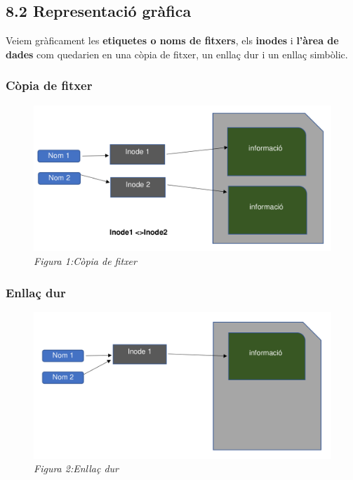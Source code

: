 \documentclass[
  12 pt,
  a4paper,
]{article}
\begin{document}
\subsection{8.2 Representació
gràfica}\label{representaciuxf3-gruxe0fica}

Veiem gràficament les \textbf{etiquetes o noms de fitxers}, els
\textbf{inodes} i \textbf{l'àrea de dades} com quedarien en una còpia de
fitxer, un enllaç dur i un enllaç simbòlic.

\subsubsection{Còpia de fitxer}\label{cuxf2pia-de-fitxer}

\begin{figure}
\centering
\includegraphics{png/copiadeFitxer.png}
\caption{\emph{Figura 1:Còpia de fitxer}}
\end{figure}

\subsubsection{Enllaç dur}\label{enllauxe7-dur}

\begin{figure}
\centering
\includegraphics{png/enllaçDur.png}
\caption{\emph{Figura 2:Enllaç dur}}
\end{figure}
\end{document}
